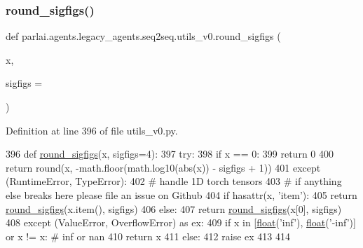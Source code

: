 \subsubsection{\texorpdfstring{round\+\_\+sigfigs()}{round\_sigfigs()}}
{\footnotesize\ttfamily def parlai.\+agents.\+legacy\+\_\+agents.\+seq2seq.\+utils\+\_\+v0.\+round\+\_\+sigfigs (\begin{DoxyParamCaption}\item[{}]{x,  }\item[{}]{sigfigs = {} }\end{DoxyParamCaption})}



Definition at line 396 of file utils\+\_\+v0.\+py.


\begin{DoxyCode}
396 \textcolor{keyword}{def }\hyperlink{namespaceparlai_1_1agents_1_1legacy__agents_1_1seq2seq_1_1utils__v0_af377ec61bfc0423461e7b409ffc883b9}{round\_sigfigs}(x, sigfigs=4):
397     \textcolor{keywordflow}{try}:
398         \textcolor{keywordflow}{if} x == 0:
399             \textcolor{keywordflow}{return} 0
400         \textcolor{keywordflow}{return} round(x, -math.floor(math.log10(abs(x)) - sigfigs + 1))
401     \textcolor{keywordflow}{except} (RuntimeError, TypeError):
402         \textcolor{comment}{# handle 1D torch tensors}
403         \textcolor{comment}{# if anything else breaks here please file an issue on Github}
404         \textcolor{keywordflow}{if} hasattr(x, \textcolor{stringliteral}{'item'}):
405             \textcolor{keywordflow}{return} \hyperlink{namespaceparlai_1_1agents_1_1legacy__agents_1_1seq2seq_1_1utils__v0_af377ec61bfc0423461e7b409ffc883b9}{round\_sigfigs}(x.item(), sigfigs)
406         \textcolor{keywordflow}{else}:
407             \textcolor{keywordflow}{return} \hyperlink{namespaceparlai_1_1agents_1_1legacy__agents_1_1seq2seq_1_1utils__v0_af377ec61bfc0423461e7b409ffc883b9}{round\_sigfigs}(x[0], sigfigs)
408     \textcolor{keywordflow}{except} (ValueError, OverflowError) \textcolor{keyword}{as} ex:
409         \textcolor{keywordflow}{if} x \textcolor{keywordflow}{in} [\hyperlink{namespaceprojects_1_1controllable__dialogue_1_1make__control__dataset_aa2b7207688c641dbc094ab44eca27113}{float}(\textcolor{stringliteral}{'inf'}), \hyperlink{namespaceprojects_1_1controllable__dialogue_1_1make__control__dataset_aa2b7207688c641dbc094ab44eca27113}{float}(\textcolor{stringliteral}{'-inf'})] \textcolor{keywordflow}{or} x != x:  \textcolor{comment}{# inf or nan}
410             \textcolor{keywordflow}{return} x
411         \textcolor{keywordflow}{else}:
412             \textcolor{keywordflow}{raise} ex
413 
414 
\end{DoxyCode}
